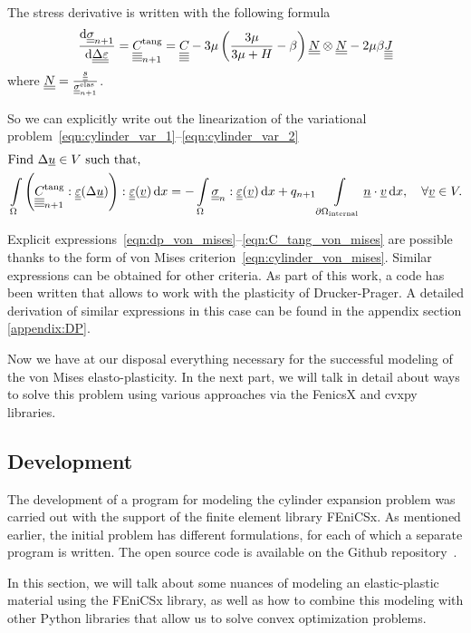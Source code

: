 \documentclass[12pt]{article}
\begin{document}
The stress derivative is written with the following formula
\begin{equation}
    \dfrac{\mathrm{d}\underline{\underline{\sigma}}_{n+1}}{\mathrm{d}\underline{\underline{\Delta\varepsilon}}} = \underline{\underline{\underline{\underline{C_{}}}}}_{n+1}^{\text{tang}} = \underline{\underline{\underline{\underline{C_{}}}}} - 3\mu \left( \frac{3\mu}{3\mu + H} -\beta \right) \underline{\underline{N}} \otimes \underline{\underline{N}} - 2\mu\beta\underline{\underline{\underline{\underline{J}}}} \label{eqn:C_tang_von_mises}
\end{equation}
where $\underline{\underline{N}} = \frac{\underline{\underline{s}}}{\underline{\underline{\sigma}}_{n+1}^{\text{elas}}}$.

So we can explicitly write out the linearization of the variational problem~\ref{eqn:cylinder_var_1}--\ref{eqn:cylinder_var_2}
\begin{align}
    & \text{Find } \Delta\underline{u} \in V \text{ such that,} \label{eqn:cylinder_lin_var_from_1} \\ 
    & \int\limits_\Omega \left( \underline{\underline{\underline{\underline{C_{}}}}}_{n+1}^\text{tang} : \underline{\underline{\varepsilon}}(\Delta\underline{u}) \right) : \underline{\underline{\varepsilon}}(\underline{v}) \, \mathrm{d} x = -\int\limits_\Omega\underline{\underline{\sigma}}_n : \underline{\underline{\varepsilon}}(\underline{v}) \, \mathrm{d} x + q_{n+1}\int\limits_{\partial\Omega_\text{internal}}\underline{n} \cdot \underline{v} \, \mathrm{d} x, \quad \forall \underline{v} \in V. \label{eqn:cylinder_lin_var_from_2} 
\end{align}

Explicit expressions~\ref{eqn:dp_von_mises}--\ref{eqn:C_tang_von_mises} are possible thanks to the form of von Mises criterion~\ref{eqn:cylinder_von_mises}. Similar expressions can be obtained for other criteria. As part of this work, a code has been written that allows to work with the plasticity of Drucker-Prager. A detailed derivation of similar expressions in this case can be found in the appendix section \ref{appendix:DP}.

Now we have at our disposal everything necessary for the successful modeling of the von Mises elasto-plasticity. In the next part, we will talk in detail about ways to solve this problem using various approaches via the FenicsX and cvxpy libraries.

\subsection{Development}

The development of a program for modeling the cylinder expansion problem was carried out with the support of the finite element library FEniCSx. As mentioned earlier, the initial problem has different formulations, for each of which a separate program is written. The open source code is available on the Github repository~\cite{convex-plasticity}. 

In this section, we will talk about some nuances of modeling an elastic-plastic material using the FEniCSx library, as well as how to combine this modeling with other Python libraries that allow us to solve convex optimization problems.
\end{document}

